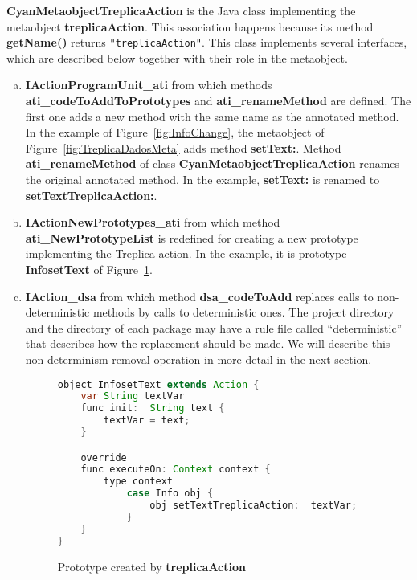\documentclass[preprint,review]{elsarticle}
\newcommand{\srcstyle}[1]{\ttfamily\textbf{#1}\rmfamily}
\begin{document}
\srcstyle{CyanMetaobjectTreplicaAction} is the Java class implementing
the  metaobject  \srcstyle{treplicaAction}. This  association  happens
because its method \srcstyle{getName()} returns \verb|"treplicaAction"|. This class implements several interfaces, which are described below together with their role in the metaobject.
\begin{enumerate}[(a)]
\item \srcstyle{IActionProgramUnit\_ati} from which methods \srcstyle{ati\_codeToAddToPrototypes} and \srcstyle{ati\_renameMethod} are defined. The first one adds a new method with the same name as the annotated method. In the example of Figure~\ref{fig:InfoChange}, the metaobject of Figure~\ref{fig:TreplicaDadosMeta} adds method \srcstyle{setText:}. Method \srcstyle{ati\_renameMethod} of class \srcstyle{CyanMetaobjectTreplicaAction} renames the original annotated method. In the example, \srcstyle{setText:} is renamed to \srcstyle{setTextTreplicaAction:}.


\item    \srcstyle{IActionNewPrototypes\_ati}   from    which   method
  \srcstyle{ati\_NewPrototypeList}  is redefined  for  creating a  new
  prototype implementing the Treplica action. In the example, it is prototype
    \srcstyle{InfosetText} of Figure~\ref{fig:TreplicaMetaActionResult}.


\item       \srcstyle{IAction\_dsa}       from      which       method
  \srcstyle{dsa\_codeToAdd} replaces  calls to non-deter\-mi\-nis\-tic
  methods by calls to deterministic ones.
    The project directory and the directory of each package may have a
    rule  file   called  ``deterministic''  that  describes   how  the
    replacement should be made.  We will describe this non-determinism
    removal operation in more detail in the next section.

\begin{figure}[h]
\centering
\begin{lstlisting}[language=Java]
object InfosetText extends Action {
    var String textVar
    func init:  String text {
        textVar = text;
    }

    override
    func executeOn: Context context {
        type context
            case Info obj {
                obj setTextTreplicaAction:  textVar;
            }
    }
}
\end{lstlisting}
\caption{Prototype created by \srcstyle{treplicaAction}}
\label{fig:TreplicaMetaActionResult}
\end{figure}





\end{enumerate}
\end{document}
